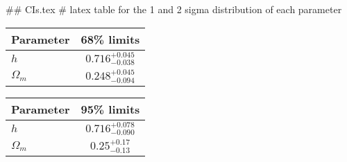 ## CIs.tex
# latex table for the 1 and 2 sigma distribution of each parameter

\begin{tabular} { l  c}
 Parameter &  68\% limits\\
\hline
{\boldmath$h              $} & $0.716^{+0.045}_{-0.038}   $\\
{\boldmath$\Omega_m       $} & $0.248^{+0.045}_{-0.094}   $\\
\hline
\end{tabular}

\begin{tabular} { l  c}
 Parameter &  95\% limits\\
\hline
{\boldmath$h              $} & $0.716^{+0.078}_{-0.090}   $\\
{\boldmath$\Omega_m       $} & $0.25^{+0.17}_{-0.13}      $\\
\hline
\end{tabular}
